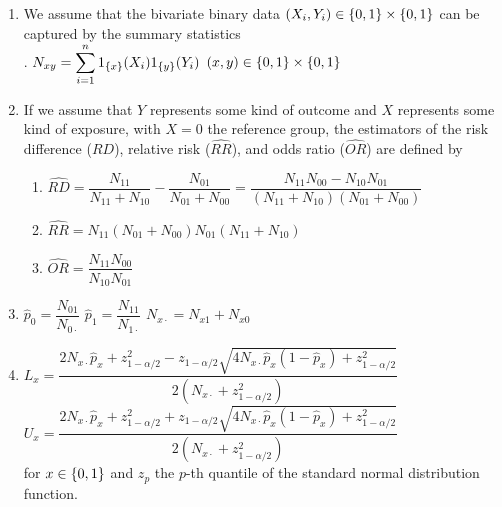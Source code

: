 \begin{enumerate}
    \item We assume that the bivariate binary data $(X_i , Y_i ) \in \left\{0, 1\right\} \times \left\{0, 1\right\}$ can be captured by the summary statistics
    \hfill \cite{statistics/book/Statistics-for-Data-Scientists/Maurits-Kaptein}
    \\
    .\hfill
    $ N_{x y} = \displaystyle\sum^n_{i=1} 1_{\left\{x\right\}}(X_i )1_{\left\{y\right\}}(Y_i ) $
    \hfill
    $ (x , y ) \in \left\{0, 1\right\} \times \left\{0, 1\right\} $
    \hfill \cite{statistics/book/Statistics-for-Data-Scientists/Maurits-Kaptein}

    \item If we assume that $Y$ represents some kind of outcome and $X$ represents some kind of exposure, with $X = 0$ the reference group, the estimators of the risk difference ($\hat{R D}$), relative risk ($\hat{R R}$), and odds ratio ($\hat{O R}$) are defined by
    \hfill \cite{statistics/book/Statistics-for-Data-Scientists/Maurits-Kaptein}
    \begin{enumerate}
        \item
        $
            \hat{R D}
            = \dfrac{N_{11}}{N_{11} + N_{10}} - \dfrac{N_{01}}{N_{01} + N_{00}}
            = \dfrac{N_{11} N_{00} - N_{10} N_{01}}{(N_{11} + N_{10})(N_{01} + N_{00}) }
        $
        \hfill \cite{statistics/book/Statistics-for-Data-Scientists/Maurits-Kaptein}

        \item $\hat{R R} = {N_{11}(N_{01} + N_{00})} {N_{01}(N_{11} + N_{10})}$
        \hfill \cite{statistics/book/Statistics-for-Data-Scientists/Maurits-Kaptein}

        \item $\hat{O R} = \dfrac{N_{11} N_{00}}{N_{10} N_{01}}$
        \hfill \cite{statistics/book/Statistics-for-Data-Scientists/Maurits-Kaptein}
    \end{enumerate}

    \item
    $\hat{p}_0 = \dfrac{N_{01}}{N_{0\cdot}}$
    \hfill
    $\hat{p}_1 = \dfrac{N_{11}}{N_{1\cdot}}$
    \hfill
    $N_{x\cdot} = N_{x1} + N_{ x0}$
    \hfill \cite{statistics/book/Statistics-for-Data-Scientists/Maurits-Kaptein}

    \item
    $
        L_x
        = \dfrac{
            2N_{x\cdot } \hat{p}_x + z^2_{1-\alpha/2}
            - z_{1-\alpha/2} \sqrt{4N_{x\cdot } \hat{p}_x (1 - \hat{p}_x ) + z^2_{1-\alpha/2}}
        }{
            2(N_{x\cdot } + z^2_{1-\alpha/2})
        }
    $
    \\[0.4cm]
    $
        U_x
        = \dfrac{
            2N_{x\cdot } \hat{p}_x + z^2_{1-\alpha/2}
            + z_{1-\alpha/2} \sqrt{4N_{x\cdot } \hat{p}_x (1 - \hat{p}_x ) + z^2_{1-\alpha/2}}
        }{
            2(N_{x\cdot } + z^2_{1-\alpha/2})
        }
    $
    \hfill \cite{statistics/book/Statistics-for-Data-Scientists/Maurits-Kaptein}
    \\[0.3cm]
    for $x \in \left\{0, 1\right\}$ and $z_p$ the $p$-th quantile of the standard normal distribution function.
    \hfill \cite{statistics/book/Statistics-for-Data-Scientists/Maurits-Kaptein}


\end{enumerate}

